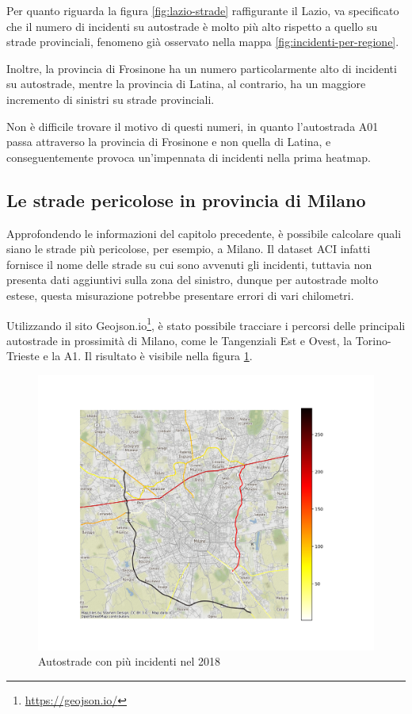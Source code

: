 \documentclass[a4paper,12pt]{report}
\begin{document}
Per quanto riguarda la figura \ref{fig:lazio-strade} raffigurante il Lazio, va 
specificato che il numero di incidenti su autostrade è molto più alto rispetto 
a quello su strade provinciali, 
fenomeno già osservato nella mappa \ref{fig:incidenti-per-regione}.

Inoltre, la provincia di Frosinone ha un numero particolarmente alto di incidenti su 
autostrade, mentre la provincia di Latina, al contrario, ha un maggiore incremento di 
sinistri su strade provinciali.

Non è difficile trovare il motivo di questi numeri, in quanto l'autostrada A01 passa 
attraverso la provincia di Frosinone e non quella di Latina, e conseguentemente provoca 
un'impennata di incidenti nella prima heatmap. 

\subsection{Le strade pericolose in provincia di Milano}

Approfondendo le informazioni del capitolo precedente, è possibile calcolare quali siano 
le strade più pericolose, per esempio, a Milano. 
Il dataset ACI infatti fornisce il nome delle strade su cui sono avvenuti gli incidenti, 
tuttavia non presenta dati aggiuntivi sulla zona del sinistro, dunque per autostrade molto 
estese, questa misurazione potrebbe presentare errori di vari chilometri. 

Utilizzando il sito Geojson.io\footnote{\url{https://geojson.io/}}, 
è stato possibile tracciare i percorsi delle principali autostrade in prossimità di 
Milano, come le Tangenziali Est e Ovest, la Torino-Trieste e la A1. 
Il risultato è visibile nella figura \ref{fig:line-incidenti-milano}.

\begin{figure}
    \includegraphics[width=\linewidth]{../src/incidenti/incidenti_aci/autostrade/incidenti_line_chart.png}
    \caption{Autostrade con più incidenti nel 2018}
    \label{fig:line-incidenti-milano}
\end{figure}
\end{document}
